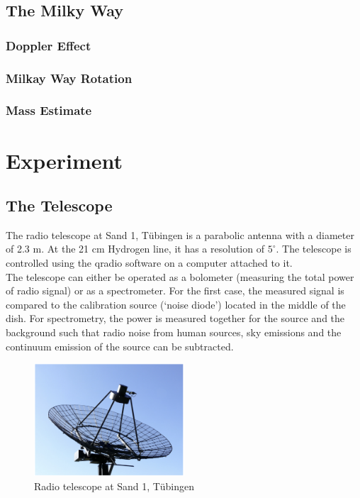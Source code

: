 \documentclass[12pt,a4paper]{article}
\begin{document}
  \subsection{The Milky Way}
    \subsubsection{Doppler Effect}
    \subsubsection{Milkay Way Rotation}
    \subsubsection{Mass Estimate}

\section{Experiment}
    \subsection{The Telescope}
        The radio telescope at Sand 1, Tübingen is a parabolic antenna with a diameter of 2.3 m. At the 21 cm Hydrogen line, it has a
        resolution of $5^\circ$. The telescope is controlled using the qradio software on a computer attached to it. \\
        The telescope can either be operated as a bolometer (measuring the total power of radio signal) or as a spectrometer. For the first case,
        the measured signal is compared to the calibration source (`noise diode') located in the middle of the dish. For spectrometry, the power is measured 
        together for the source and the background such that radio noise from human sources, sky emissions and the continuum emission of the source can be subtracted.

        \begin{figure}[H]
            \centering
            \includegraphics[width=0.5\textwidth]{telescope.png}
            \caption{Radio telescope at Sand 1, Tübingen}
            \label{fig:telescope}
        \end{figure}
\end{document}
